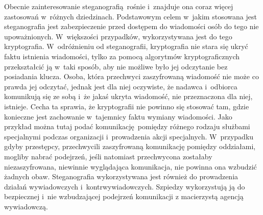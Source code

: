 \documentclass[a4paper, twoside, 12pt]{report}
\begin{document}
        Obecnie zainteresowanie steganografią rośnie i~znajduje ona coraz więcej
        zastosowań w~różnych dziedzinach. Podstawowym celem w~jakim stosowana jest
        steganografia jest zabezpieczenie przed dostępem do wiadomości osób do tego nie
        upoważnionych. W~większości przypadków, wykorzystywana jest do tego
        kryptografia. W~odróżnieniu od steganografii, kryptografia nie stara się
        ukryć faktu istnienia wiadomości, tylko za pomocą algorytmów kryptograficznych
        przekształcić ją w~taki sposób, aby nie możliwe było jej odczytanie bez posiadania
        klucza. Osoba, która przechwyci zaszyfrowaną wiadomość nie może co prawda jej
        odczytać, jednak jest dla niej oczywiste, że nadawca i~odbiorca
        komunikują się ze sobą i~że jakaś ukryta wiadomość, nie przeznaczona dla niej,
        istnieje\cite{DIGITALWATERMARKING}. Cecha ta sprawia, że kryptografii nie
        powinno się stosować tam, gdzie konieczne jest zachowanie w~tajemnicy
        faktu wymiany wiadomości. Jako przykład
        można tutaj podać komunikację pomiędzy różnego rodzaju służbami specjalnymi
        podczas organizacji i~prowadzenia akcji specjalnych.
        W~przypadku gdyby przestępcy, przechwycili zaszyfrowaną komunikację
        pomiędzy oddziałami, mogliby nabrać podejrzeń, jeśli natomiast przechwycona
        zostałaby niezaszyfrowana, niewinnie wyglądająca komunikacja, nie powinna ona
        wzbudzić żadnych obaw. Steganografia wykorzystywana jest również do prowadzenia
        działań wywiadowczych i~kontrwywiadowczych. Szpiedzy wykorzystują ją do
        bezpiecznej i~nie wzbudzającej podejrzeń komunikacji z macierzystą agencją
        wywiadowczą.
\end{document}
